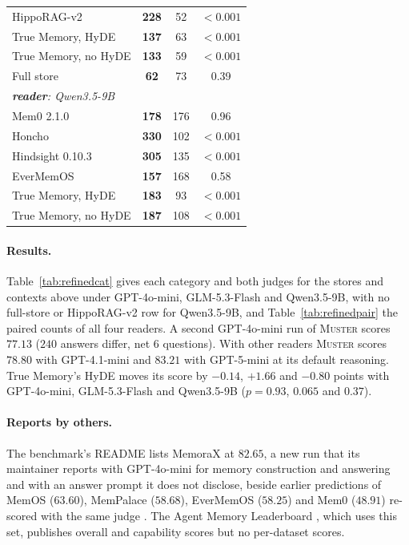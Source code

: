 \documentclass{article}
\newcommand{\sys}{\textsc{Muster}}
\begin{document}
\begin{table}[!t]
\begin{tabular}{l>{\columncolor{oursbg}}ccc}
HippoRAG-v2 & \textbf{228} & 52 & $<0.001$ \\
True Memory, HyDE & \textbf{137} & 63 & $<0.001$ \\
True Memory, no HyDE & \textbf{133} & 59 & $<0.001$ \\
Full store & \textbf{62} & 73 & 0.39 \\
\multicolumn{4}{l}{\emph{\textbf{reader}: Qwen3.5-9B}}\\
Mem0 2.1.0 & \textbf{178} & 176 & 0.96 \\
Honcho & \textbf{330} & 102 & $<0.001$ \\
Hindsight 0.10.3 & \textbf{305} & 135 & $<0.001$ \\
EverMemOS & \textbf{157} & 168 & 0.58 \\
True Memory, HyDE & \textbf{183} & 93 & $<0.001$ \\
True Memory, no HyDE & \textbf{187} & 108 & $<0.001$ \\
\bottomrule
\end{tabular}
\end{table}

\paragraph{Results.} Table~\ref{tab:refinedcat} gives each category and both judges for the stores and contexts above under GPT-4o-mini, GLM-5.3-Flash and Qwen3.5-9B, with no full-store or HippoRAG-v2 row for Qwen3.5-9B, and Table~\ref{tab:refinedpair} the paired counts of all four readers. A second GPT-4o-mini run of \sys{} scores $77.13$ ($240$ answers differ, net $6$ questions). With other readers \sys{} scores $78.80$ with GPT-4.1-mini and $83.21$ with GPT-5-mini at its default reasoning. True Memory's HyDE moves its score by $-0.14$, $+1.66$ and $-0.80$ points with GPT-4o-mini, GLM-5.3-Flash and Qwen3.5-9B ($p=0.93$, $0.065$ and $0.37$).

\paragraph{Reports by others.} The benchmark's README lists MemoraX at $82.65$, a new run that its maintainer reports with GPT-4o-mini for memory construction and answering and with an answer prompt it does not disclose, beside earlier predictions of MemOS ($63.60$), MemPalace ($58.68$), EverMemOS ($58.25$) and Mem0 ($48.91$) re-scored with the same judge \cite{locomorefined}. The Agent Memory Leaderboard \cite{aml}, which uses this set, publishes overall and capability scores but no per-dataset scores.
\end{document}
